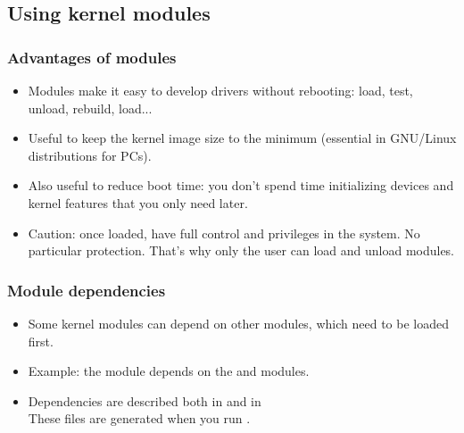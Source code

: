 \subsection{Using kernel modules}

\begin{frame}
  \frametitle{Advantages of modules}
  \begin{itemize}
  \item Modules make it easy to develop drivers without rebooting:
    load, test, unload, rebuild, load...
  \item Useful to keep the kernel image size to the minimum (essential
    in GNU/Linux distributions for PCs).
  \item Also useful to reduce boot time: you don't spend time
    initializing devices and kernel features that you only need later.
  \item Caution: once loaded, have full control and privileges in the
    system. No particular protection. That's why only the  user
    can load and unload modules.
  \end{itemize}
\end{frame}

\begin{frame}
  \frametitle{Module dependencies}
  \begin{itemize}
  \item Some kernel modules can depend on other modules,
    which need to be loaded first.
  \item Example: the  module depends on the
     and  modules.
  \item Dependencies are described
    both in 
    and in \\
    These files are generated when you run .
  \end{itemize}
\end{frame}

